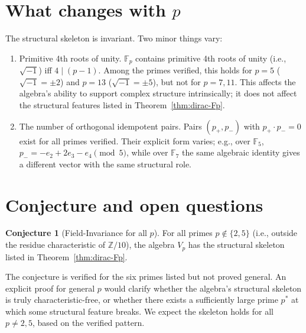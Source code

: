 \documentclass[11pt,reqno]{amsart}
\theoremstyle{plain}
\theoremstyle{definition}
\newtheorem{conjecture}[theorem]{Conjecture}
\theoremstyle{remark}
\newcommand{\Z}{\mathbb{Z}}
\newcommand{\F}{\mathbb{F}}
\begin{document}
\section{What changes with $p$}

The structural skeleton is invariant. Two minor things vary:

\begin{enumerate}
\item Primitive 4th roots of unity. $\F_p$ contains primitive 4th roots
of unity (i.e., $\sqrt{-1}$) iff $4 \mid (p-1)$. Among the primes
verified, this holds for $p = 5$ ($\sqrt{-1} = \pm 2$) and $p = 13$
($\sqrt{-1} = \pm 5$), but not for $p = 7, 11$. This affects the
algebra's ability to support complex structure intrinsically; it does
not affect the structural features listed in
Theorem~\ref{thm:dirac-Fp}.

\item The number of orthogonal idempotent pairs. Pairs $(p_+, p_-)$
with $p_+ \cdot p_- = 0$ exist for all primes verified. Their explicit
form varies; e.g., over $\F_5$, $p_- = -e_2 + 2 e_3 - e_4 \pmod 5$,
while over $\F_7$ the same algebraic identity gives a different vector
with the same structural role.
\end{enumerate}

\section{Conjecture and open questions}

\begin{conjecture}[Field-Invariance for all $p$]\label{conj:fpuniv-allp}
For all primes $p \notin \{2, 5\}$ (i.e., outside the residue
characteristic of $\Z/10$), the algebra $V_p$ has the structural
skeleton listed in Theorem~\ref{thm:dirac-Fp}.
\end{conjecture}

The conjecture is verified for the six primes listed but not proved
general. An explicit proof for general $p$ would clarify whether the
algebra's structural skeleton is truly characteristic-free, or whether
there exists a sufficiently large prime $p^*$ at which some structural
feature breaks. We expect the skeleton holds for all $p \neq 2, 5$,
based on the verified pattern.
\end{document}
